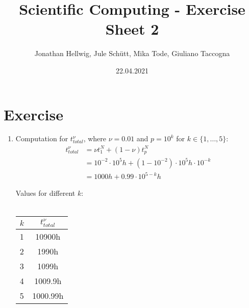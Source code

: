 \documentclass{article}
\title{Scientific Computing - Exercise Sheet 2}
\author{Jonathan Hellwig, Jule Schütt, Mika Tode, Giuliano Taccogna}
\date{22.04.2021}
\begin{document}
\maketitle

\section{Exercise}
\begin{enumerate}[label=(\alph*)]
  \item Computation for $t_{total}^\nu$, where $\nu=0.01$ and $p=10^k$ for $k\in\{1,\dots,5\}$:
    \begin{align*}
      t^{\nu}_{total}   &= \nu t_1^N+(1-\nu)t_p^N\\
                        &= 10^{-2} \cdot 10^5h + (1 - 10^{-2}) \cdot 10^5h\cdot 10^{-k} \\
                        &= 1000h + 0.99 \cdot 10^{5-k}h
    \end{align*}
    \begin{center}
    Values for different $k$:\\~\\
\begin{tabular}{ l | c } 
  $k$ & $t^{\nu}_{total}$ \\
  \hline
  1 & 10900h \\
  2 & 1990h  \\
  3 & 1099h  \\
  4 & 1009.9h  \\
  5 & 1000.99h  \\
\end{tabular}        
    \end{center}
    

\end{enumerate}
\end{document}
